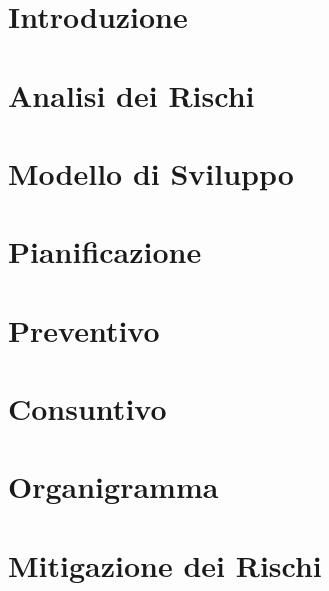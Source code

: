 \documentclass[8pt]{article}
\newcommand{\signatureline}[1]{%
	 \par\vspace{0.5cm}
	\noindent\makebox[\linewidth][r]{\rule{0.2\textwidth}{0.5pt}\hspace{3cm}\makebox[0pt][r]{\vspace{3pt}\footnotesize #1}}%
}
\begin{document}
\section{Introduzione} \label{sec:intro}

\section{Analisi dei Rischi} \label{sec:rischi}

\section{Modello di Sviluppo}

\section{Pianificazione}

\section{Preventivo}

\section{Consuntivo}

\section{Organigramma}

\section{Mitigazione dei Rischi}

\newpage


\end{document}
